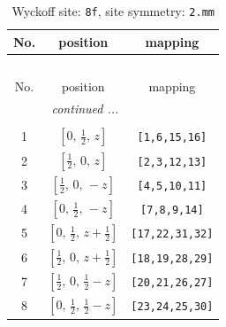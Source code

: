 \documentclass[fleqn,8pt]{jsarticle}
\begin{document}
\begin{longtable}{ccc}
\caption{Wyckoff site: {\tt 8f}, site symmetry: {\tt 2.mm}}
 \\
 \hline \hline
No. & position & mapping \\ \hline \endfirsthead

\multicolumn{2}{l}{\tablename\ \thetable{}} \\
 \hline \hline
No. & position & mapping \\ \hline \endhead

 \hline \hline
\multicolumn{2}{r}{\footnotesize\it continued ...} \\ \endfoot

 \hline \hline
\multicolumn{2}{r}{} \\ \endlastfoot

1 & $\left[ 0,\, \frac{1}{2},\, z \right]$ & {\tt [1,6,15,16]} \\ \hline
2 & $\left[ \frac{1}{2},\, 0,\, z \right]$ & {\tt [2,3,12,13]} \\ \hline
3 & $\left[ \frac{1}{2},\, 0,\, - z \right]$ & {\tt [4,5,10,11]} \\ \hline
4 & $\left[ 0,\, \frac{1}{2},\, - z \right]$ & {\tt [7,8,9,14]} \\ \hline
5 & $\left[ 0,\, \frac{1}{2},\, z + \frac{1}{2} \right]$ & {\tt [17,22,31,32]} \\ \hline
6 & $\left[ \frac{1}{2},\, 0,\, z + \frac{1}{2} \right]$ & {\tt [18,19,28,29]} \\ \hline
7 & $\left[ \frac{1}{2},\, 0,\, \frac{1}{2} - z \right]$ & {\tt [20,21,26,27]} \\ \hline
8 & $\left[ 0,\, \frac{1}{2},\, \frac{1}{2} - z \right]$ & {\tt [23,24,25,30]} \\
\end{longtable}
\renewcommand{\arraystretch}{1.2}
\end{document}
